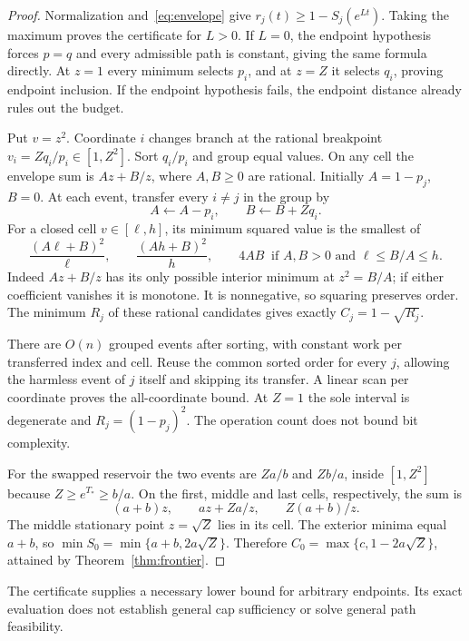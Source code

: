 \begin{proof}
Normalization and~\eqref{eq:envelope} give $r_j(t)\ge1-S_j(e^{Lt})$. Taking the maximum proves the certificate for $L>0$. If $L=0$, the endpoint hypothesis forces $p=q$ and every admissible path is constant, giving the same formula directly. At $z=1$ every minimum selects $p_i$, and at $z=Z$ it selects $q_i$, proving endpoint inclusion. If the endpoint hypothesis fails, the endpoint distance already rules out the budget.

Put $v=z^2$. Coordinate $i$ changes branch at the rational breakpoint $v_i=Zq_i/p_i\in[1,Z^2]$. Sort $q_i/p_i$ and group equal values. On any cell the envelope sum is $Az+B/z$, where $A,B\ge0$ are rational. Initially $A=1-p_j$, $B=0$. At each event, transfer every $i\ne j$ in the group by
\[
 A\leftarrow A-p_i,\qquad B\leftarrow B+Zq_i.
\]
For a closed cell $v\in[\ell,h]$, its minimum squared value is the smallest of
\begin{equation}\label{eq:cell}
 \frac{(A\ell+B)^2}{\ell},\qquad
 \frac{(Ah+B)^2}{h},\qquad
 4AB\ \text{ if }A,B>0\text{ and }\ell\le B/A\le h.
\end{equation}
Indeed $Az+B/z$ has its only possible interior minimum at $z^2=B/A$; if either coefficient vanishes it is monotone. It is nonnegative, so squaring preserves order. The minimum $R_j$ of these rational candidates gives exactly $C_j=1-\sqrt{R_j}$.

There are $O(n)$ grouped events after sorting, with constant work per transferred index and cell. Reuse the common sorted order for every $j$, allowing the harmless event of $j$ itself and skipping its transfer. A linear scan per coordinate proves the all-coordinate bound. At $Z=1$ the sole interval is degenerate and $R_j=(1-p_j)^2$. The operation count does not bound bit complexity.

For the swapped reservoir the two events are $Za/b$ and $Zb/a$, inside $[1,Z^2]$ because $Z\ge e^{T_*}\ge b/a$. On the first, middle and last cells, respectively, the sum is
\[
 (a+b)z,\qquad az+Za/z,\qquad Z(a+b)/z.
\]
The middle stationary point $z=\sqrt Z$ lies in its cell. The exterior minima equal $a+b$, so
$\min S_0=\min\{a+b,2a\sqrt Z\}$. Therefore $C_0=\max\{c,1-2a\sqrt Z\}$, attained by Theorem~\ref{thm:frontier}.
\end{proof}

The certificate supplies a necessary lower bound for arbitrary endpoints. Its exact evaluation does not establish general cap sufficiency or solve general path feasibility.


